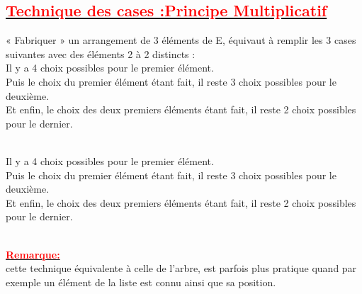 \documentclass[12pt]{article}
\begin{document}
\subsection*{\underline{\textbf{\textcolor{red}{Technique des cases :Principe Multiplicatif}}}}
« Fabriquer » un arrangement de 3 éléments de E, équivaut à remplir les 3 cases suivantes avec des éléments 2 à 2 distincts :\\
Il y a 4 choix possibles pour le premier élément.\\

Puis le choix du premier élément étant fait, il reste 3 choix possibles pour le deuxième.\\

Et enfin, le choix des deux premiers éléments étant fait, il reste 2 choix possibles pour le dernier.\\
\\
Il y a 4 choix possibles pour le premier élément.\\

Puis le choix du premier élément étant fait, il reste 3 choix possibles pour le deuxième.\\

Et enfin, le choix des deux premiers éléments étant fait, il reste 2 choix possibles pour le dernier.\\
\\ 
\underline{\textbf{\textcolor{red}{Remarque:}}}\\
cette technique équivalente à celle de l’arbre, est parfois plus pratique quand par exemple un élément de la liste est connu ainsi que sa position.\\
\end{document}
